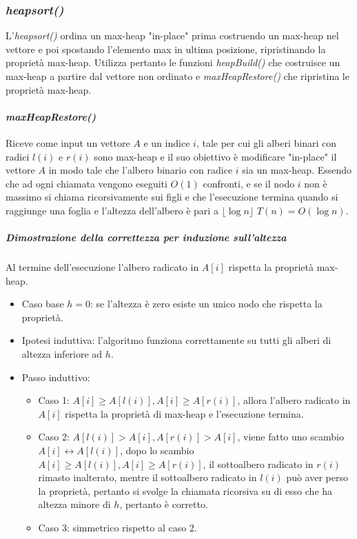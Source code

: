 \subsubsection{\emph{heapsort()}}
L'\emph{heapsort()} ordina un max-heap "in-place" prima costruendo un max-heap nel vettore e poi spostando l'elemento max in ultima posizione, ripristinando
la propriet\`a max-heap. Utilizza pertanto le funzioni \emph{heapBuild()} che costruisce un max-heap a partire dal vettore non ordinato e \emph{ 
maxHeapRestore()} che ripristina le propriet\`a max-heap.
\paragraph{\emph{maxHeapRestore()}}
Riceve come input un vettore $A$ e un indice $i$, tale per cui gli alberi binari con radici $l(i)$ e $r(i)$ sono max-heap e il suo obiettivo \`e modificare
"in-place" il vettore $A$ in modo tale che l'albero binario con radice $i$ sia un max-heap. Essendo che ad ogni chiamata vengono eseguiti $O(1)$ confronti, 
e se il nodo $i$ non \`e massimo si chiama ricorsivamente sui figli e che l'esecuzione termina quando si raggiunge una foglia e l'altezza dell'albero \`e
pari a $\lfloor \log n\rfloor$ $T(n)=O(\log n)$.

\subparagraph{Dimostrazione della correttezza per induzione sull'altezza}
Al termine dell'esecuzione l'albero radicato in $A[i]$ rispetta la propriet\`a max-heap.
\begin{itemize}
\item Caso base $h=0$: se l'altezza \`e zero esiste un unico nodo che rispetta la propriet\`a.
\item Ipotesi induttiva: l'algoritmo funziona correttamente su tutti gli alberi di altezza inferiore ad $h$.
\item Passo induttivo:
\begin{itemize}
\item Caso 1: $A[i]\ge A[l(i)], A[i]\ge A[r(i)]$, allora l'albero radicato in $A[i]$ rispetta la propriet\`a di max-heap e l'esecuzione termina.
\item Caso 2: $A[l(i)] > A[i], A[r(i)]> A[i]$, viene fatto uno scambio $A[i]\leftrightarrow A[l(i)]$, dopo lo scambio $A[i]\ge A[l(i)], A[i]\ge A[r(i)]$, 
il sottoalbero radicato in $r(i)$ rimasto inalterato,  mentre il sottoalbero radicato in $l(i)$ pu\`o aver perso la propriet\`a, pertanto si svolge la 
chiamata ricorsiva su di esso che ha altezza minore di $h$, pertanto \`e corretto.
\item Caso 3: simmetrico rispetto al caso 2.
\end{itemize}
\end{itemize}

